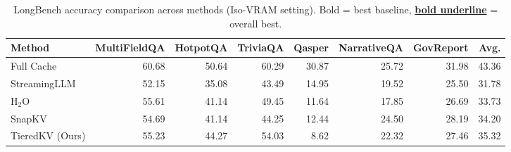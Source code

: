 \begin{table}[t]
\centering\small
\setlength{\tabcolsep}{4pt}
\caption{LongBench accuracy comparison across methods (Iso-VRAM setting). Bold = best baseline, \textbf{\underline{bold underline}} = overall best.}
\label{tab:accuracy_fair}
\begin{tabular}{lrrrrrrr}
\toprule
\textbf{Method} & \textbf{MultiFieldQA} & \textbf{HotpotQA} & \textbf{TriviaQA} & \textbf{Qasper} & \textbf{NarrativeQA} & \textbf{GovReport} & \textbf{Avg.} \\
\midrule
Full Cache & 60.68 & 50.64 & 60.29 & 30.87 & 25.72 & 31.98 & 43.36 \\
StreamingLLM & 52.15 & 35.08 & 43.49 & 14.95 & 19.52 & 25.50 & 31.78 \\
H$_2$O & 55.61 & 41.14 & 49.45 & 11.64 & 17.85 & 26.69 & 33.73 \\
SnapKV & 54.69 & 41.14 & 44.25 & 12.44 & 24.50 & 28.19 & 34.20 \\
TieredKV (Ours) & 55.23 & 44.27 & 54.03 & 8.62 & 22.32 & 27.46 & 35.32 \\
\bottomrule
\end{tabular}
\end{table}
